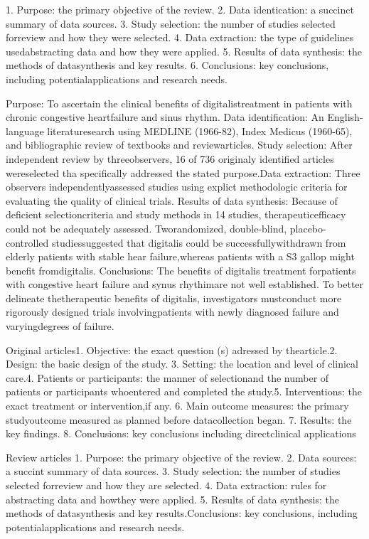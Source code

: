 1. Purpose:  the primary objective of the review.
2. Data identication: a succinct summary of data sources.
3. Study selection: the number of studies selected forreview and how they were selected.
4. Data  extraction:  the  type  of  guidelines  usedabstracting data and how they were applied.
5. Results  of  data  synthesis:  the  methods  of  datasynthesis  and  key  results.
6. Conclusions:  key  conclusions,  including  potentialapplications and research needs.


Purpose: To ascertain the clinical benefits of digitalistreatment  in  patients  with  chronic  congestive  heartfailure and sinus rhythm.
Data  identification:  An  English-language  literaturesearch using MEDLINE (1966-82), Index Medicus (1960-65), and bibliographic review of textbooks and reviewarticles.
Study  selection:  After  independent  review  by  threeobservers, 16 of 736 originaly identified articles wereselected tha specifically addressed the stated purpose.Data  extraction:  Three  observers  independentlyassessed studies using explict methodologic criteria for evaluating the quality of clinical trials.
Results of data synthesis: Because of deficient selectioncriteria  and  study  methods  in  14  studies,  therapeuticefficacy  could  not  be  adequately  assessed.  Tworandomized, double-blind, placebo-controlled studiessuggested  that  digitalis  could  be  successfullywithdrawn from elderly patients with stable hear failure,whereas patients with a S3 gallop might benefit fromdigitalis.
Conclusions:  The  benefits  of  digitalis  treatment  forpatients with congestive heart failure and synus rhythimare  not  well  established.  To  better  delineate  thetherapeutic  benefits  of  digitalis,  investigators  mustconduct  more  rigorously  designed  trials  involvingpatients  with  newly  diagnosed  failure  and  varyingdegrees of failure.


Original articles1. Objective: the exact question (s) adressed by thearticle.2. Design:  the basic design of the study.
3. Setting: the location and level of clinical care.4. Patients  or  participants:  the  manner  of  selectionand  the  number  of  patients  or  participants  whoentered and completed the study.5. Interventions: the exact treatment or intervention,if any.
6. Main  outcome  measures:  the  primary  studyoutcome  measured  as  planned  before  datacollection began.
7. Results: the key findings.
8. Conclusions:  key  conclusions  including  directclinical applications

Review articles
1. Purpose: the primary objective of the review.
2. Data sources: a succint summary of data sources. 
3. Study selection: the number of studies selected forreview and how they are selected.
4. Data extraction: rules for abstracting data and howthey were applied.
5. Results  of  data  synthesis:  the  methods  of  datasynthesis  and  key  results.Conclusions:  key  conclusions,  including  potentialapplications and research needs.

